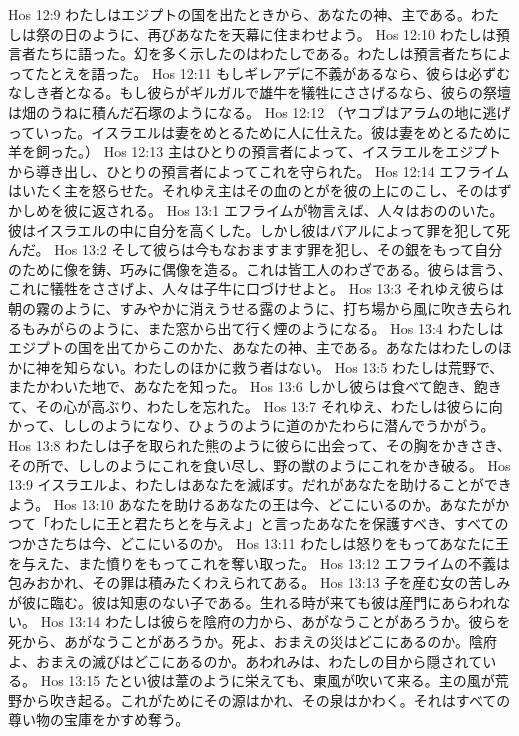 Hos 12:9  わたしはエジプトの国を出たときから、あなたの神、主である。わたしは祭の日のように、再びあなたを天幕に住まわせよう。
Hos 12:10  わたしは預言者たちに語った。幻を多く示したのはわたしである。わたしは預言者たちによってたとえを語った。
Hos 12:11  もしギレアデに不義があるなら、彼らは必ずむなしき者となる。もし彼らがギルガルで雄牛を犠牲にささげるなら、彼らの祭壇は畑のうねに積んだ石塚のようになる。
Hos 12:12  （ヤコブはアラムの地に逃げっていった。イスラエルは妻をめとるために人に仕えた。彼は妻をめとるために羊を飼った。）
Hos 12:13  主はひとりの預言者によって、イスラエルをエジプトから導き出し、ひとりの預言者によってこれを守られた。
Hos 12:14  エフライムはいたく主を怒らせた。それゆえ主はその血のとがを彼の上にのこし、そのはずかしめを彼に返される。
Hos 13:1  エフライムが物言えば、人々はおののいた。彼はイスラエルの中に自分を高くした。しかし彼はバアルによって罪を犯して死んだ。
Hos 13:2  そして彼らは今もなおますます罪を犯し、その銀をもって自分のために像を鋳、巧みに偶像を造る。これは皆工人のわざである。彼らは言う、これに犠牲をささげよ、人々は子牛に口づけせよと。
Hos 13:3  それゆえ彼らは朝の霧のように、すみやかに消えうせる露のように、打ち場から風に吹き去られるもみがらのように、また窓から出て行く煙のようになる。
Hos 13:4  わたしはエジプトの国を出てからこのかた、あなたの神、主である。あなたはわたしのほかに神を知らない。わたしのほかに救う者はない。
Hos 13:5  わたしは荒野で、またかわいた地で、あなたを知った。
Hos 13:6  しかし彼らは食べて飽き、飽きて、その心が高ぶり、わたしを忘れた。
Hos 13:7  それゆえ、わたしは彼らに向かって、ししのようになり、ひょうのように道のかたわらに潜んでうかがう。
Hos 13:8  わたしは子を取られた熊のように彼らに出会って、その胸をかきさき、その所で、ししのようにこれを食い尽し、野の獣のようにこれをかき破る。
Hos 13:9  イスラエルよ、わたしはあなたを滅ぼす。だれがあなたを助けることができよう。
Hos 13:10  あなたを助けるあなたの王は今、どこにいるのか。あなたがかつて「わたしに王と君たちとを与えよ」と言ったあなたを保護すべき、すべてのつかさたちは今、どこにいるのか。
Hos 13:11  わたしは怒りをもってあなたに王を与えた、また憤りをもってこれを奪い取った。
Hos 13:12  エフライムの不義は包みおかれ、その罪は積みたくわえられてある。
Hos 13:13  子を産む女の苦しみが彼に臨む。彼は知恵のない子である。生れる時が来ても彼は産門にあらわれない。
Hos 13:14  わたしは彼らを陰府の力から、あがなうことがあろうか。彼らを死から、あがなうことがあろうか。死よ、おまえの災はどこにあるのか。陰府よ、おまえの滅びはどこにあるのか。あわれみは、わたしの目から隠されている。
Hos 13:15  たとい彼は葦のように栄えても、東風が吹いて来る。主の風が荒野から吹き起る。これがためにその源はかれ、その泉はかわく。それはすべての尊い物の宝庫をかすめ奪う。
